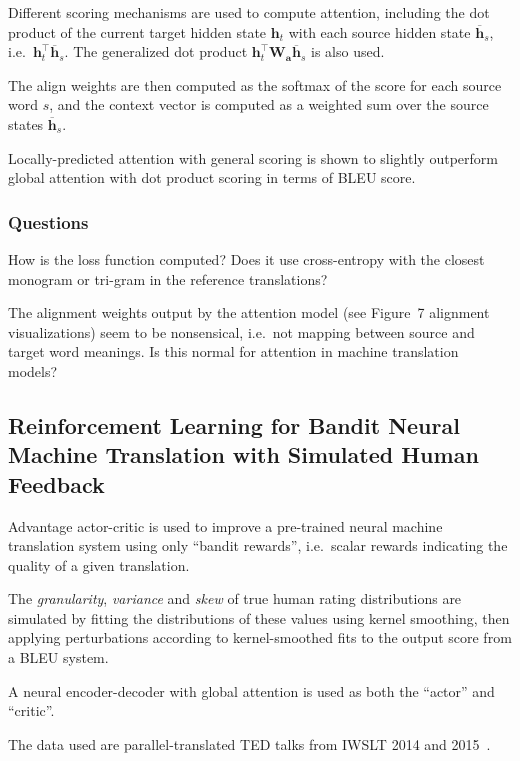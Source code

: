 \documentclass[a4paper, 12pt]{article}
\begin{document}
Different scoring mechanisms are used to compute attention, including the dot
product of the current target hidden state $\mathbf{h}_t$ with each source
hidden state $\overline{\mathbf{h}}_s$, i.e.\
$\mathbf{h}_t^\intercal \overline{\mathbf{h}}_s$. The generalized dot product
$\mathbf{h}_t^\intercal \mathbf{W}_\mathbf{a} \overline{\mathbf{h}}_s$ is also
used.

The align weights are then computed as the softmax of the score for each source
word $s$, and the context vector is computed as a weighted sum over the source
states $\overline{\mathbf{h}}_s$.

Locally-predicted attention with general scoring is shown to slightly
outperform global attention with dot product scoring in terms of BLEU score.

\subsubsection{Questions}

How is the loss function computed? Does it use cross-entropy with the closest
monogram or tri-gram in the reference translations?

The alignment weights output by the attention model (see Figure~7 alignment
visualizations) seem to be nonsensical, i.e.\ not mapping between source and
target word meanings. Is this normal for attention in machine translation
models?


\subsection{Reinforcement Learning for Bandit Neural Machine Translation with
            Simulated Human Feedback~\citet{DBLP:journals/corr/NguyenDB17}}

Advantage actor-critic is used to improve a pre-trained neural machine
translation system using only ``bandit rewards'', i.e.\ scalar rewards
indicating the quality of a given translation.

The \emph{granularity}, \emph{variance} and \emph{skew} of true human rating
distributions are simulated by fitting the distributions of these values using
kernel smoothing, then applying perturbations according to kernel-smoothed fits
to the output score from a BLEU system.

A neural encoder-decoder with global attention is used as both the ``actor''
and ``critic''.

The data used are parallel-translated TED talks from IWSLT 2014 and
2015~\citet{cettolo2015iwslt}.
\end{document}
